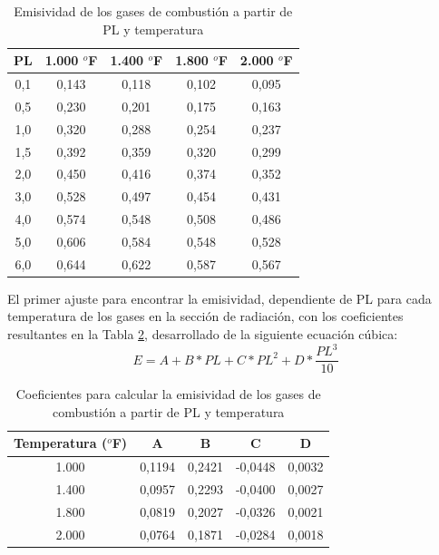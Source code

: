 \begin{table}[H]
\caption{Emisividad de los gases de combustión a partir de PL y temperatura}
\label{tbl:pl}
\centering
\begin{tabular}{c|c|c|c|c}
PL	& 1.000 $^o$F   & 1.400 $^o$F   & 1.800 $^o$F   & 2.000 $^o$F\\
\hline
0,1	& 0,143	        & 0,118	        & 0,102	        & 0,095\\
0,5	& 0,230	        & 0,201	        & 0,175	        & 0,163\\
1,0	& 0,320	        & 0,288	        & 0,254	        & 0,237\\
1,5	& 0,392	        & 0,359	        & 0,320         & 0,299\\
2,0	& 0,450	        & 0,416	        & 0,374	        & 0,352\\
3,0	& 0,528	        & 0,497	        & 0,454	        & 0,431\\
4,0	& 0,574	        & 0,548	        & 0,508	        & 0,486\\
5,0	& 0,606	        & 0,584	        & 0,548	        & 0,528\\
6,0	& 0,644	        & 0,622	        & 0,587	        & 0,567\\
\end{tabular}
\end{table}
\par El primer ajuste para encontrar la emisividad, dependiente de PL para cada temperatura de los gases en la sección de radiación, con los coeficientes resultantes en la Tabla \ref{tbl:emisividad}, desarrollado de la siguiente ecuación cúbica:
\begin{equation}
\label{eq:emisividad}
E = A + B*PL + C*PL^2 + D*\frac{PL^3}{10}
\end{equation}
\begin{table}[H]
\caption{Coeficientes para calcular la emisividad de los gases de combustión a partir de PL y temperatura}
\label{tbl:emisividad}
\centering
\begin{tabular}{c|c|c|c|c}		
Temperatura ($^o$F) & A	 & B  & C       & D  \\
\hline
1.000    	& 0,1194 & 0,2421 & -0,0448	& 0,0032\\
1.400       & 0,0957 & 0,2293 & -0,0400	& 0,0027\\
1.800       & 0,0819 & 0,2027 & -0,0326	& 0,0021\\
2.000       & 0,0764 & 0,1871 & -0,0284	& 0,0018\\
\end{tabular}
\end{table}

